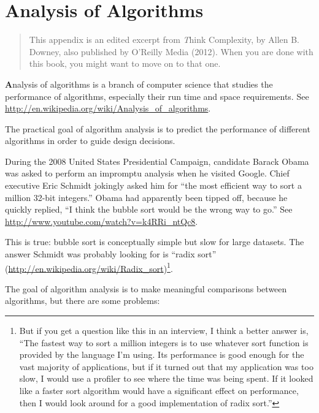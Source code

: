 \documentclass[
DIV=11,
fontsize=13,
twoside,
headinclude=false,
titlepage=firstiscover,
abstract=true,
headsepline=true,
footsepline=true,
chapterprefix=true, %
headings=big,
bibliography=totoc,%
captions=tableheading
]{scrbook}
\theoremstyle{definition}
\begin{document}
\chapter{Analysis of Algorithms}
\label{algorithms}

\begin{quote}
This appendix is an edited excerpt from {\textit Think Complexity}, by
Allen B. Downey, also published by O'Reilly Media (2012).  When you
are done with this book, you might want to move on to that one.
\end{quote}

{\textbf Analysis of algorithms} is a branch of computer science that
studies the performance of algorithms, especially their run time and
space requirements.  See
\url{http://en.wikipedia.org/wiki/Analysis_of_algorithms}.
 

The practical goal of algorithm analysis is to predict the performance
of different algorithms in order to guide design decisions.

During the 2008 United States Presidential Campaign, candidate
Barack Obama was asked to perform an impromptu analysis when
he visited Google.  Chief executive Eric Schmidt jokingly asked him
for ``the most efficient way to sort a million 32-bit integers.''
Obama had apparently been tipped off, because he quickly
replied, ``I think the bubble sort would be the wrong way to go.''
See \url{http://www.youtube.com/watch?v=k4RRi_ntQc8}.

This is true: bubble sort is conceptually simple but slow for
large datasets.  The answer Schmidt was probably looking for is
``radix sort'' (\url{http://en.wikipedia.org/wiki/Radix_sort})\footnote{
But if you get a question like this in an interview, I think
a better answer is, ``The fastest way to sort a million integers
is to use whatever sort function is provided by the language
I'm using.  Its performance is good enough for the vast majority
of applications, but if it turned out that my application was too
slow, I would use a profiler to see where the time was being
spent.  If it looked like a faster sort algorithm would have
a significant effect on performance, then I would look
around for a good implementation of radix sort.''}.

The goal of algorithm analysis is to make meaningful
comparisons between algorithms, but there are some problems:
\end{document}
